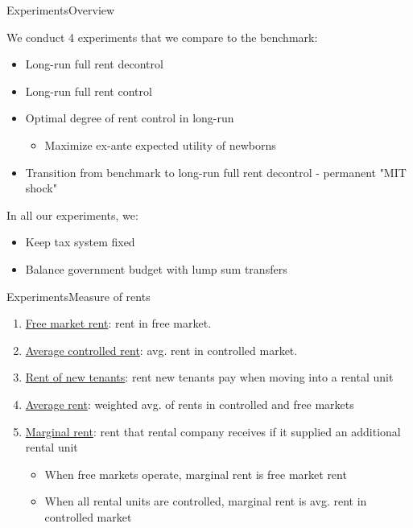 \documentclass[11pt,aspectratio=169]{beamer}
\begin{document}
\begin{frame}{Experiments}{Overview}

We conduct 4 experiments that we compare to the benchmark:
\begin{itemize}
    \item Long-run full rent decontrol
    \item Long-run full rent control
    \item Optimal degree of rent control in long-run
    \begin{itemize}
        \item Maximize ex-ante expected utility of newborns \citep{conesa-et-al,gkkoc}
    \end{itemize}
    \item Transition from benchmark to long-run full rent decontrol - permanent "MIT shock"
\end{itemize}

\vspace{0.5cm}

In all our experiments, we:
\begin{itemize}
    \item Keep tax system fixed
    \item Balance government budget with lump sum transfers
\end{itemize}
    
\end{frame}

\begin{frame}{Experiments}{Measure of rents}

\begin{enumerate}
    \item \underline{Free market rent}: rent in free market.
    \item \underline{Average controlled rent}: avg. rent in controlled market.
    \item \underline{Rent of new tenants}: rent new tenants pay when moving into a rental unit
    \item \underline{Average rent}: weighted avg. of rents in controlled and free markets
    \item \underline{Marginal rent}: rent that rental company receives if it supplied an additional rental unit
    \begin{itemize}
        \item When free markets operate, marginal rent is free market rent
        \item When all rental units are controlled, marginal rent is avg. rent in controlled market
    \end{itemize}
\end{enumerate}

\end{frame}
\end{document}
